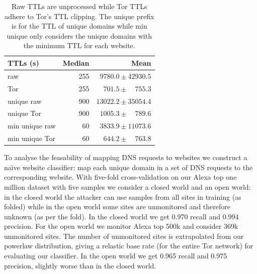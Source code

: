 \begin{table}[t]
\caption{Raw TTLs are unprocessed while Tor TTLs adhere to Tor's TTL clipping.
The unique prefix is for the TTL of unique domains while min unique only
considers the unique domains with the minimum TTL for each website.}
\centering
\begin{tabular}{l r r}
\toprule
\textbf{TTLs (s)} & \textbf{Median} & \textbf{Mean} \\
\midrule
raw & 255 & $9780.0\pm42930.5$ \\ %
Tor & 255 & $701.5\pm\phantom{00}755.3$ \\ %
unique raw & 900 & $13022.2\pm35054.4$ \\ %
unique Tor & 900 & $1005.3\pm\phantom{00}789.6$ \\ %
min unique raw & 60 & $3833.9\pm11073.6$ \\ %
min unique Tor & 60 & $644.2\pm\phantom{00}763.8$ \\ %
\bottomrule
\end{tabular}
\label{tab:ttls}
\end{table}

To analyse the feasability of mapping DNS requests to websites we construct a
na\"{\i}ve website classifier: map each unique domain in a set of DNS requests
to the corresponding website.
With five-fold cross-validation on our Alexa top one million dataset with five
samples we consider a closed world and an open world: in the closed world the
attacker can use samples from all sites in training (as folded) while in the
open world some sites are unmonitored and therefore unknown (as per the fold).
In the closed world we get 0.970 recall and 0.994 precision.
For the open world we monitor Alexa top 500k and consider 369k unmonitored
sites. The number of unmonitored sites is extrapolated from our powerlaw
distribution, giving a relastic base rate (for the entire Tor network) for
evaluating our classifier.
In the open world we get 0.965 recall and 0.975 precision, slightly
worse than in the closed world.

